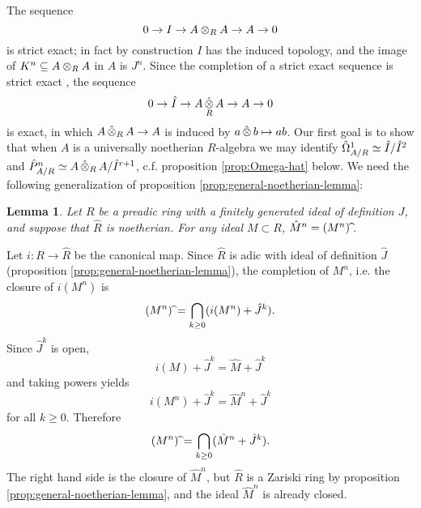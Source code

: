 \documentclass{article}
\theoremstyle{change}
\newtheorem{lemma}[subsubsection]{Lemma}
\numberwithin{equation}{subsubsection}
\newcommand{\demobox}{\vrule height6pt width6pt depth0pt}
\newenvironment{demo}{\noindent{\it Proof.}}
{{\unskip\nobreak\hfil\qquad
\demobox\parfillskip=0pt\par}
\medskip}
\newcommand\hI{\hat I}
\newcommand\hJ{\hat J}
\begin{document}
The sequence
\begin{displaymath}
  0\to I\to A\otimes_RA\to A\to0
\end{displaymath}
is strict exact; in fact by construction $I$ has the induced topology,
and the image of $K^n\subseteq A\otimes_RA$ in $A$ is $J^n$. Since the
completion of a strict exact sequence is strict exact \cite[Ch. III
\S2 no. 12 Lemme 2]{bourbaki-AC}, the sequence
\begin{equation}
  \label{eq:hatI-as-kernel}
  0\to\hI\to A\ctens_RA\to A\to 0
\end{equation}
is exact, in which $A\mathop{\hat\otimes}_RA\to A$ is induced by
$a\mathop{\hat\otimes} b\mapsto ab$. Our first goal is to show that when $A$ is a
universally noetherian $R$-algebra we may identify
$\cdiff_{A/R}\simeq\hI/\hI^2$ and
$\hat P^n_{A/R}\simeq A\ctens_RA/\hI^{r+1}$, c.f. proposition
\ref{prop:Omega-hat} below. We need the following generalization of
proposition \ref{prop:general-noetherian-lemma}:

\begin{lemma}\label{lemma:completions-of-powers}
  Let $R$ be a preadic ring with a finitely generated ideal of
  definition $J$, and suppose that $\hat R$ is noetherian. For any
  ideal $M\subset R$, $\hat M^n=(M^n)\,\widehat\relax$. 
\end{lemma}
\begin{demo}
  Let $i:R\to\hat R$ be the canonical map. Since $\hat R$ is adic with
  ideal of definition $\hat J$ (proposition
  \ref{prop:general-noetherian-lemma}), the completion of $M^n$,
  i.e. the closure of $i(M^n)$ is
  \begin{displaymath}
    (M^n)\,\widehat\relax=\bigcap_{k\ge0}(i(M^n)+\hat J^k).
  \end{displaymath}
  Since $\hat J^k$ is open,
  \begin{displaymath}
    i(M)+\hJ^k=\hat M+\hJ^k
  \end{displaymath}
  and taking powers yields
  \begin{displaymath}
    i(M^n)+\hJ^k=\hat M^n+\hJ^k
  \end{displaymath}
  for all $k\ge0$. Therefore 
  \begin{displaymath}
    (M^n)\,\widehat\relax=\bigcap_{k\ge0}(\hat M^n+\hat J^k).
  \end{displaymath}
  The right hand side is the closure of $\hat M^n$, but $\hat R$ is a
  Zariski ring by proposition \ref{prop:general-noetherian-lemma}, and
  the ideal $\hat M^n$ is already closed.
\end{demo}
\end{document}
